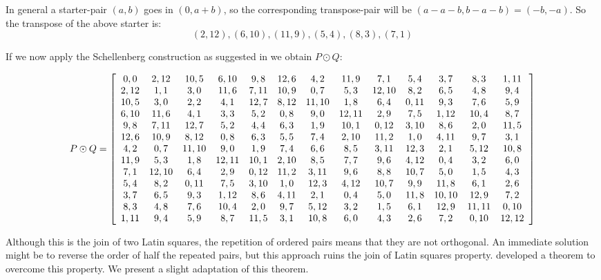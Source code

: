 \documentclass[
  11pt,
  a4paper]{book}
\begin{document}
In general a starter-pair \((a, b)\) goes in \((0, a +b)\), so the
corresponding transpose-pair will be
\((a - a - b, b - a - b) = (-b, -a)\). So the transpose of the above
starter is: \[(2, 12), (6, 10), (11, 9), (5, 4), (8, 3), (7, 1)\]

If we now apply the Schellenberg construction as suggested in
\textcite{hwang_complete_1984} we obtain \(P \odot Q\):

\begin{equation}
  P \odot Q = \left[\begin{array}{*{13}c}
   0,0  & 2,12  & 10,5  & 6,10  & 9,8  & 12,6 &  4,2  & 11,9  &  7,1  & 5,4  &  3,7  &  8,3  & 1,11 \\
   2,12 &  1,1  &  3,0  & 11,6  & 7,11 & 10,9 &  0,7  &  5,3  & 12,10 & 8,2  &  6,5  &  4,8  &  9,4 \\
   10,5 &  3,0  &  2,2  &  4,1  & 12,7 & 8,12 & 11,10 &  1,8  &  6,4  & 0,11 &  9,3  &  7,6  &  5,9 \\
   6,10 & 11,6  &  4,1  &  3,3  & 5,2  & 0,8  &  9,0  & 12,11 &  2,9  & 7,5  & 1,12  & 10,4  &  8,7 \\
   9,8  & 7,11  & 12,7  &  5,2  & 4,4  & 6,3  &  1,9  & 10,1  & 0,12  & 3,10 &  8,6  &  2,0  & 11,5 \\
   12,6 & 10,9  & 8,12  &  0,8  & 6,3  & 5,5  &  7,4  & 2,10  & 11,2  & 1,0  & 4,11  &  9,7  &  3,1 \\
   4,2  &  0,7  & 11,10 &  9,0  & 1,9  & 7,4  &  6,6  &  8,5  & 3,11  & 12,3 &  2,1  & 5,12  & 10,8 \\
   11,9 &  5,3  &  1,8  & 12,11 & 10,1 & 2,10 &  8,5  &  7,7  &  9,6  & 4,12 &  0,4  &  3,2  &  6,0 \\
   7,1  & 12,10 &  6,4  &  2,9  & 0,12 & 11,2 & 3,11  &  9,6  &  8,8  & 10,7 &  5,0  &  1,5  &  4,3 \\
   5,4  &  8,2  & 0,11  &  7,5  & 3,10 & 1,0  & 12,3  & 4,12  & 10,7  & 9,9  & 11,8  &  6,1  &  2,6 \\
   3,7  &  6,5  &  9,3  & 1,12  & 8,6  & 4,11 &  2,1  &  0,4  &  5,0  & 11,8 & 10,10 & 12,9  &  7,2 \\
   8,3  &  4,8  &  7,6  & 10,4  & 2,0  & 9,7  & 5,12  &  3,2  &  1,5  & 6,1  & 12,9  & 11,11 & 0,10 \\
   1,11 &  9,4  &  5,9  &  8,7  & 11,5 & 3,1  & 10,8  &  6,0  &  4,3  & 2,6  &  7,2  & 0,10  & 12,12 \\
  \end{array}\right]
\end{equation}

Although this is the join of two Latin squares, the repetition of
ordered pairs means that they are not orthogonal. An immediate solution
might be to reverse the order of half the repeated pairs, but this
approach ruins the join of Latin squares property.
\textcite{anderson_construction_1999} developed a theorem to overcome
this property. We present a slight adaptation of this theorem.
\end{document}
